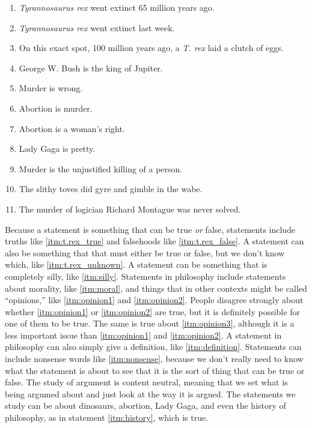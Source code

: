 \begin{enumerate}[label=(\alph*)]
\item \label{itm:t.rex_true}\emph{Tyrannosaurus rex} went extinct 65 million years ago. 
\item \label{itm:t.rex_false}\emph{Tyrannosaurus rex} went extinct last week.
\item \label{itm:t.rex_unknown}On this exact spot, 100  million years ago, a \emph{T. rex} laid a clutch of eggs. 
\item \label{itm:silly}George W. Bush is the king of Jupiter. 
\item \label{itm:moral}Murder is wrong. 
\item \label{itm:opinion1}Abortion is murder. 
\item \label{itm:opinion2}Abortion is a woman's right. 
\item \label{itm:opinion3}Lady Gaga is pretty.
\item \label{itm:definition}Murder is the unjustified killing of a person.
\item \label{itm:nonsense}The slithy toves did gyre and gimble in the wabe.
\item \label{itm:history}The murder of logician Richard Montague was never solved. 
\end{enumerate}

Because a statement is something that can be true \emph{or} false, statements include truths like \ref{itm:t.rex_true} and falsehoods like \ref{itm:t.rex_false}. A statement can also be something that that must either be true or false, but we don't know which, like \ref{itm:t.rex_unknown}. A statement can be something that is completely silly, like \ref{itm:silly}. Statements in philosophy include statements about morality, like \ref{itm:moral}, and things that in other contexts might be called ``opinions,'' like \ref{itm:opinion1} and \ref{itm:opinion2}. People disagree strongly about whether \ref{itm:opinion1} or \ref{itm:opinion2} are true, but it is definitely possible for one of them to be true. The same is true about \ref{itm:opinion3}, although it is a less important issue than \ref{itm:opinion1} and \ref{itm:opinion2}. A statement in philosophy can also simply give a definition, like \ref{itm:definition}.  Statements can include nonsense words like \ref{itm:nonsense}, because we don't really need to know what the statement is about to see that it is the sort of thing that can be true or false. The study of argument is content neutral, meaning that we set what is being argumed about and just look at the way it is argued. The statements we study can be about dinosaurs, abortion, Lady Gaga, and even the history of philosophy, as in statement \ref{itm:history}, which is true.

